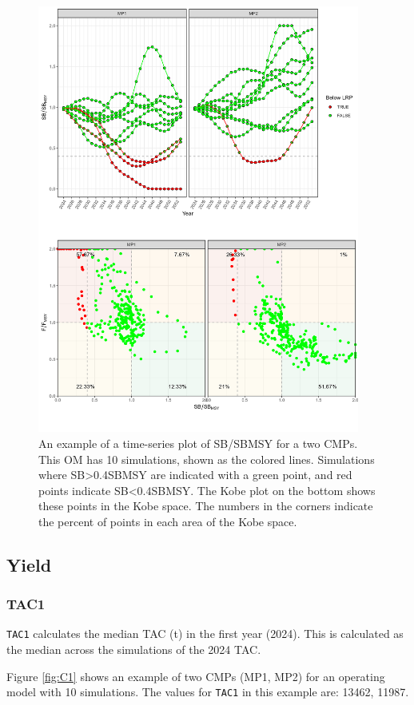 \documentclass[
]{article}
\begin{document}
\begin{figure}
\includegraphics[width=400px]{../../img/PMs/LRP} \caption{An example of a time-series plot of SB/SBMSY for a two CMPs. This OM has 10 simulations, shown as the colored lines. Simulations where SB>0.4SBMSY are indicated with a green point, and red points indicate SB<0.4SBMSY. The Kobe plot on the bottom shows these points in the Kobe space. The numbers in the corners indicate the percent of points in each area of the Kobe space.}\label{fig:LRP}
\end{figure}

\hypertarget{yield}{%
\subsection{Yield}\label{yield}}

\hypertarget{tac1}{%
\subsubsection{TAC1}\label{tac1}}

\texttt{TAC1} calculates the median TAC (t) in the first year (2024). This is calculated as the median across the simulations of the 2024 TAC.

Figure \ref{fig:C1} shows an example of two CMPs (MP1, MP2) for an operating model with 10 simulations. The values for \texttt{TAC1} in this example are: 13462, 11987.
\end{document}
